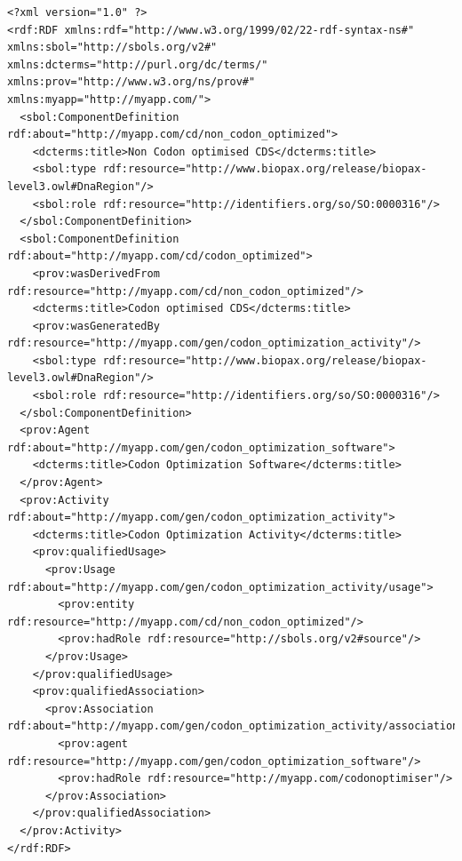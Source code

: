 \begin{lstlisting}
<?xml version="1.0" ?>
<rdf:RDF xmlns:rdf="http://www.w3.org/1999/02/22-rdf-syntax-ns#" xmlns:sbol="http://sbols.org/v2#" 
xmlns:dcterms="http://purl.org/dc/terms/" xmlns:prov="http://www.w3.org/ns/prov#" xmlns:myapp="http://myapp.com/">
  <sbol:ComponentDefinition rdf:about="http://myapp.com/cd/non_codon_optimized">
    <dcterms:title>Non Codon optimised CDS</dcterms:title>
    <sbol:type rdf:resource="http://www.biopax.org/release/biopax-level3.owl#DnaRegion"/>
    <sbol:role rdf:resource="http://identifiers.org/so/SO:0000316"/>
  </sbol:ComponentDefinition>
  <sbol:ComponentDefinition rdf:about="http://myapp.com/cd/codon_optimized">
    <prov:wasDerivedFrom rdf:resource="http://myapp.com/cd/non_codon_optimized"/>
    <dcterms:title>Codon optimised CDS</dcterms:title>
    <prov:wasGeneratedBy rdf:resource="http://myapp.com/gen/codon_optimization_activity"/>
    <sbol:type rdf:resource="http://www.biopax.org/release/biopax-level3.owl#DnaRegion"/>
    <sbol:role rdf:resource="http://identifiers.org/so/SO:0000316"/>
  </sbol:ComponentDefinition>
  <prov:Agent rdf:about="http://myapp.com/gen/codon_optimization_software">
    <dcterms:title>Codon Optimization Software</dcterms:title>
  </prov:Agent>
  <prov:Activity rdf:about="http://myapp.com/gen/codon_optimization_activity">
    <dcterms:title>Codon Optimization Activity</dcterms:title>
    <prov:qualifiedUsage>
      <prov:Usage rdf:about="http://myapp.com/gen/codon_optimization_activity/usage">
        <prov:entity rdf:resource="http://myapp.com/cd/non_codon_optimized"/>
        <prov:hadRole rdf:resource="http://sbols.org/v2#source"/>
      </prov:Usage>
    </prov:qualifiedUsage>
    <prov:qualifiedAssociation>
      <prov:Association rdf:about="http://myapp.com/gen/codon_optimization_activity/association">
        <prov:agent rdf:resource="http://myapp.com/gen/codon_optimization_software"/>
        <prov:hadRole rdf:resource="http://myapp.com/codonoptimiser"/>
      </prov:Association>
    </prov:qualifiedAssociation>
  </prov:Activity>
</rdf:RDF>
\end{lstlisting}


